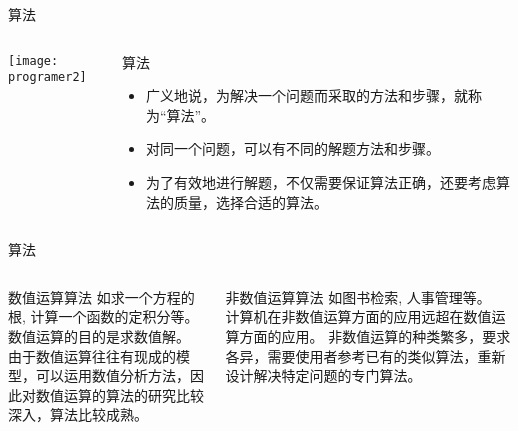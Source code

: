\begin{frame}{算法}
\begin{columns}
\texttt{[image: programer2]}
\begin{block}{算法}
\begin{itemize}
	\item 广义地说，为解决一个问题而采取的方法和步骤，就称为“算法”。
	\item 对同一个问题，可以有不同的解题方法和步骤。
	\item 为了有效地进行解题，不仅需要保证算法正确，还要考虑算法的质量，选择合适的算法。
\end{itemize} 
\end{block}
\end{columns}
\end{frame}

\begin{frame}{算法}
\begin{columns}[t]
\begin{block}{数值运算算法}
如求一个方程的根, 计算一个函数的定积分等。\\
数值运算的目的是求数值解。\\
由于数值运算往往有现成的模型，可以运用数值分析方法，因此对数值运算的算法的研究比较深入，算法比较成熟。	
\end{block}
\begin{block}{非数值运算算法}
如图书检索, 人事管理等。\\
计算机在非数值运算方面的应用远超在数值运算方面的应用。
非数值运算的种类繁多，要求各异，需要使用者参考已有的类似算法，重新设计解决特定问题的专门算法。
\end{block}
\end{columns}
\end{frame}

